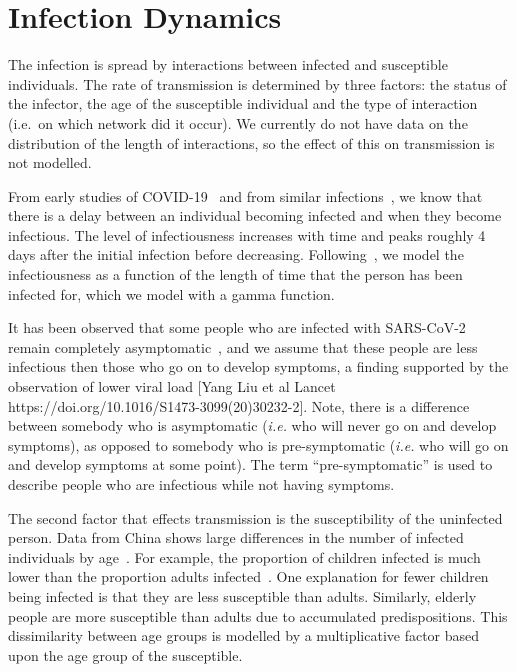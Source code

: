 \documentclass[12pt, oneside]{amsart}   	%
\begin{document}
\section{Infection Dynamics}\label{section_ibm_infection}
The infection is spread by interactions between infected and susceptible individuals. 
The rate of transmission is determined by three factors: the status of the infector, the age of the susceptible individual and the type of interaction (i.e.\ on which network did it occur).
We currently do not have data on the distribution of the length of interactions, so the effect of this on transmission is not modelled.

From early studies of COVID-19~\citep{ferretti2020quantifying, ganyani2020estimating} and
from similar infections~\citep{chan2003sars,anderson2004epidemiology,meltzer2004multiple}, we know that there is a delay between an individual becoming infected and when they become infectious.
The level of infectiousness increases with time and peaks roughly 4 days after the initial infection before decreasing.
Following~\citep{ferretti2020quantifying}, we model the infectiousness as a function of the length of time that the person has been infected for, which we model with a gamma function. 

It has been observed that some people who are infected with SARS-CoV-2 remain completely asymptomatic~\citep{bai2020presumed}, and we assume that these people are less infectious then those who go on to develop symptoms, a finding supported by the observation of lower viral load [Yang Liu et al Lancet  https://doi.org/10.1016/S1473-3099(20)30232-2]. 
Note, there is a difference between somebody who is asymptomatic (\emph{i.e.} who will never go on and develop symptoms), as opposed to somebody who is pre-symptomatic (\emph{i.e.} who will go on and develop symptoms at some point).
The term ``pre-symptomatic'' is used to describe people who are infectious while not having symptoms. 

The second factor that effects transmission is the susceptibility of the uninfected person. 
Data from China shows large differences in the number of infected individuals by age~\citep{chinavital}.
For example, the proportion of children infected is much lower than the proportion adults infected~\citep{lu2020sars}.
One explanation for fewer children being infected is that they are less susceptible than adults. 
Similarly, elderly people are more susceptible than adults due to accumulated predispositions. 
This dissimilarity between age groups is modelled by a multiplicative factor based upon the age group of the susceptible.
\end{document}

